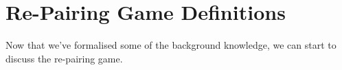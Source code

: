 \section{Re-Pairing Game Definitions}
Now that we've formalised some of the background knowledge, we can start to discuss the re-pairing game. 



